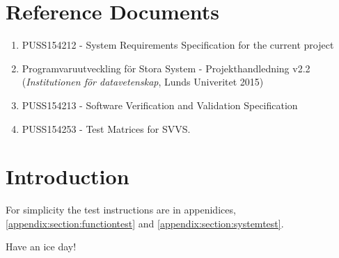 \documentclass[a4paper]{article}
\begin{document}
\setcounter{tocdepth}{2}
\tableofcontents
\newpage
{}


\section{Reference Documents}
\begin{enumerate}
\item PUSS154212 - System Requirements Specification for the current project \label{refdocs:srs}
\item Programvaruutveckling för Stora System - Projekthandledning v2.2 (\textit{Institutionen för datavetenskap}, Lunds Univeritet 2015) \label{refdocs:projekthandledning}
\item PUSS154213 - Software Verification and Validation Specification \label{redocs:SVVS}
\item PUSS154253 - Test Matrices for SVVS. \label{refdocs:matrices}
\end{enumerate}

\section{Introduction}
For simplicity the test instructions are in appenidices, \ref{appendix:section:functiontest} and \ref{appendix:section:systemtest}.

Have an ice day!
\end{document}
